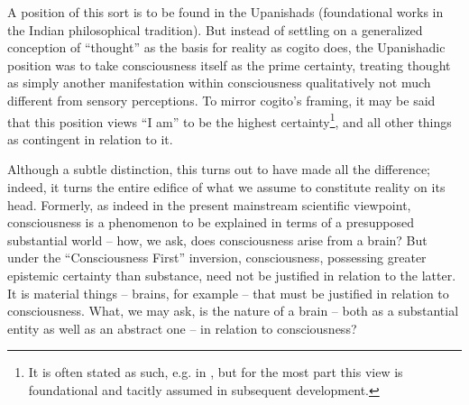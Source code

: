 \documentclass[pra,twocolumn,groupedaddress,10pt]{revtex4}
\theoremstyle{definition}
\begin{document}
A position of this sort is to be found in the Upanishads (foundational works in the Indian philosophical tradition). But instead of settling on a generalized conception of ``thought'' as the basis for reality as cogito does, the Upanishadic position was to take consciousness itself as the prime certainty, treating thought as simply another manifestation within consciousness qualitatively not much different from sensory perceptions. To mirror cogito's framing, it may be said that this position views ``I am'' to be the highest certainty\footnote{It is often stated as such, e.g. in \cite{brihadaranyaka}, but for the most part this view is foundational and tacitly assumed in subsequent development.}, and all other things as contingent in relation to it.

Although a subtle distinction, this turns out to have made all the difference; indeed, it turns the entire edifice of what we assume to constitute reality on its head. Formerly, as indeed in the present mainstream scientific viewpoint, consciousness is a phenomenon to be explained in terms of a presupposed substantial world -- how, we ask, does consciousness arise from a brain? But under the ``Consciousness First'' inversion, consciousness, possessing greater epistemic certainty than substance, need not be justified in relation to the latter. It is material things -- brains, for example -- that must be justified in relation to consciousness. What, we may ask, is the nature of a brain -- both as a substantial entity as well as an abstract one -- in relation to consciousness?
\end{document}
